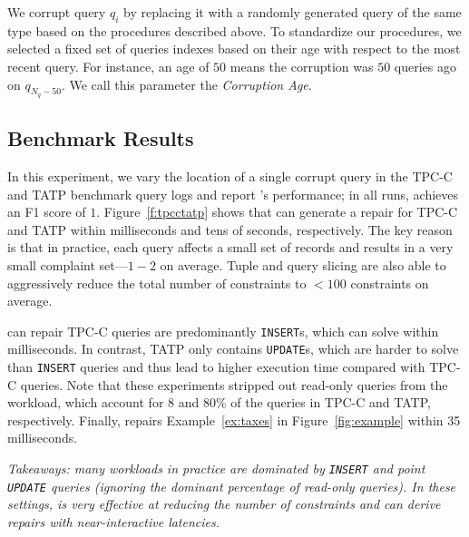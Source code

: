  We corrupt query $q_i$ by replacing it with a randomly
generated query of the same type based on the procedures described above.
To standardize our procedures, we selected a fixed set of queries indexes based on their age with respect to the most recent query.
For instance, an age of $50$ means the corruption was $50$ queries ago on $q_{N_q-50}$.
We call this parameter the {\it Corruption Age}.




\subsection{Benchmark Results}
\label{sec:experiments:benchmark}
In this experiment, we vary the location of a single corrupt query in the TPC-C and TATP benchmark query logs and report \sys's performance;
in all runs, \sys achieves an F1 score of $1$.
Figure~\ref{f:tpcctatp} shows that \sys can generate a repair for TPC-C and TATP within milliseconds and tens of seconds, respectively.
The key reason is that in practice, each query affects a small set of records and results in a very small complaint set---$1-2$ on average.
Tuple and query slicing are also able to aggressively reduce the total number of constraints to $<100$ constraints on average.

\sys can repair TPC-C  queries are predominantly \texttt{INSERT}s, which \sys can solve within milliseconds. 
In contrast, TATP only contains \texttt{UPDATE}s, which are harder to solve than \texttt{INSERT} queries and thus lead to higher execution time compared with TPC-C queries.
Note that these experiments stripped out read-only queries from the workload, which account for $8$ and $80\%$ of the queries in TPC-C and TATP, respectively.
Finally, \sys repairs Example~\ref{ex:taxes} in Figure~\ref{fig:example} within 35 milliseconds. 


{\it Takeaways: many workloads in practice are dominated by \texttt{INSERT} and point \texttt{UPDATE} queries (ignoring the dominant percentage of read-only queries).  
In these settings, \sys is very effective at reducing the number of constraints and can derive repairs with near-interactive latencies.}

